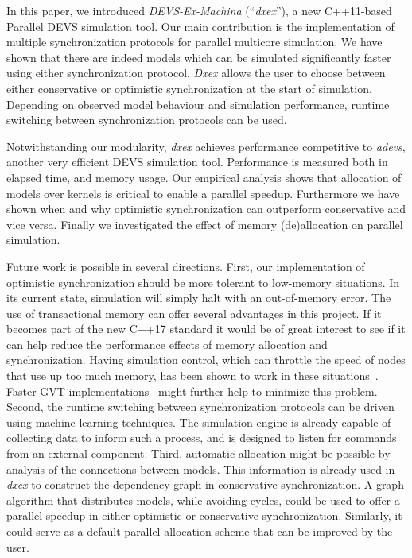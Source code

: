 In this paper, we introduced \textit{DEVS-Ex-Machina} (``\textit{dxex}''), a new C++11-based \textsf{Parallel DEVS} simulation tool.
Our main contribution is the implementation of multiple synchronization protocols for parallel multicore simulation.
We have shown that there are indeed models which can be simulated significantly faster using either synchronization protocol.
\textit{Dxex} allows the user to choose between either conservative or optimistic synchronization at the start of simulation.
Depending on observed model behaviour and simulation performance, runtime switching between synchronization protocols can be used.

Notwithstanding our modularity, \textit{dxex} achieves performance competitive to \textit{adevs}, another very efficient \textsf{DEVS} simulation tool.
Performance is measured both in elapsed time, and memory usage.
Our empirical analysis shows that allocation of models over kernels is critical to enable a parallel speedup. Furthermore we have shown when and why optimistic synchronization can outperform conservative and vice versa. Finally we investigated the effect of memory (de)allocation on parallel simulation. 

Future work is possible in several directions.
First, our implementation of optimistic synchronization should be more tolerant to low-memory situations.
In its current state, simulation will simply halt with an out-of-memory error. The use of transactional memory can offer several advantages in this project. If it becomes part of the new C++17 standard it would be of great interest to see if it can help reduce the performance effects of memory allocation and synchronization.
Having simulation control, which can throttle the speed of nodes that use up too much memory, has been shown to work in these situations~\cite{FujimotoBook}.
Faster GVT implementations~\cite{Fujimoto:1997:CGV:268403.268404,Bauer:2005:SND:1069810.1070159} might further help to minimize this problem.
Second, the runtime switching between synchronization protocols can be driven using machine learning techniques.
The simulation engine is already capable of collecting data to inform such a process, and is designed to listen for commands from an external component.
Third, automatic allocation might be possible by analysis of the connections between models.
This information is already used in \textit{dxex} to construct the dependency graph in conservative synchronization.
A graph algorithm that distributes models, while avoiding cycles, could be used to offer a parallel speedup in either optimistic or conservative synchronization.
Similarly, it could serve as a default parallel allocation scheme that can be improved by the user.
